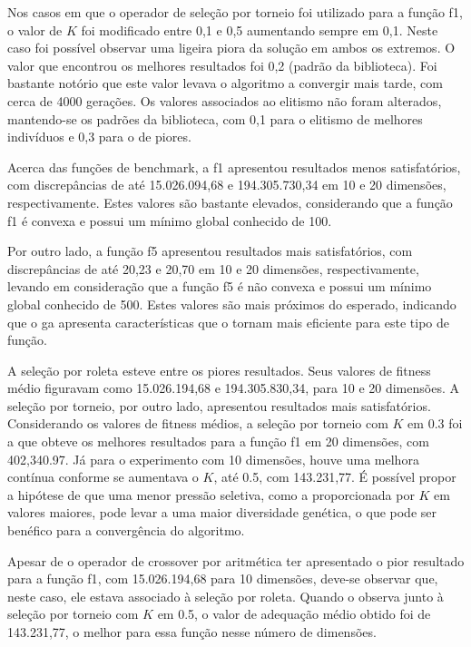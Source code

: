 Nos casos em que o operador de seleção por torneio foi utilizado para a função \gls{f1}, o valor de \( K \) foi modificado entre 0,1 e 0,5 aumentando sempre em 0,1.
Neste caso foi possível observar uma ligeira piora da solução em ambos os extremos.
O valor que encontrou os melhores resultados foi 0,2 (padrão da biblioteca).
Foi bastante notório que este valor levava o algoritmo a convergir mais tarde, com cerca de 4000 gerações.
Os valores associados ao elitismo não foram alterados, mantendo-se os padrões da biblioteca, com 0,1 para o elitismo de melhores indivíduos e 0,3 para o de piores.

Acerca das funções de benchmark, a \gls{f1} apresentou resultados menos satisfatórios, com discrepâncias de até 15.026.094,68 e 194.305.730,34 em 10 e 20 dimensões, respectivamente.
Estes valores são bastante elevados, considerando que a função \gls{f1} é convexa e possui um mínimo global conhecido de 100.

Por outro lado, a função \gls{f5} apresentou resultados mais satisfatórios, com discrepâncias de até 20,23 e 20,70 em 10 e 20 dimensões, respectivamente, levando em consideração que a função \gls{f5} é não convexa e possui um mínimo global conhecido de 500.
Estes valores são mais próximos do esperado, indicando que o \gls{ga} apresenta características que o tornam mais eficiente para este tipo de função.

A seleção por roleta esteve entre os piores resultados. Seus valores de \gls{fitness} médio figuravam como 15.026.194,68 e 194.305.830,34, para 10 e 20 dimensões.
A seleção por torneio, por outro lado, apresentou resultados mais satisfatórios.
Considerando os valores de \gls{fitness} médios, a seleção por torneio com \( K \) em 0.3 foi a que obteve os melhores resultados para a função \gls{f1} em 20 dimensões, com 402,340.97.
Já para o experimento com 10 dimensões, houve uma melhora contínua conforme se aumentava o \( K \), até 0.5, com 143.231,77.
É possível propor a hipótese de que uma menor pressão seletiva, como a proporcionada por \( K \) em valores maiores, pode levar a uma maior diversidade genética, o que pode ser benéfico para a convergência do algoritmo.

Apesar de o operador de \gls{crossover} por aritmética ter apresentado o pior resultado para a função \gls{f1}, com 15.026.194,68 para 10 dimensões, deve-se observar que, neste caso, ele estava associado à seleção por roleta.
Quando o observa junto à seleção por torneio com \( K \) em 0.5, o valor de adequação médio obtido foi de 143.231,77, o melhor para essa função nesse número de dimensões.

